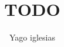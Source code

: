 \documentclass{article}
\begin{document}
\title{TODO}
\author{Yago iglesias}
\maketitle
\tableofcontents
\end{document}
